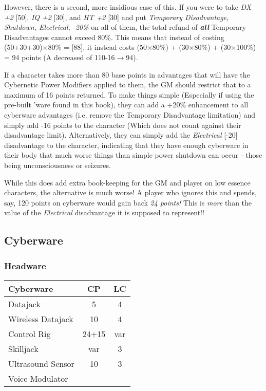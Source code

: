\begin{multicols*}{3}
	However, there is a second, more insidious case of this. If you were to take \textit{DX +2} [50], \textit{IQ +2} [30], and \textit{HT +2} [30] and put \textit{Temporary Disadvantage, Shutdown, Electrical, -20\%} on all of them, the total refund of \textbf{\textit{all}} Temporary Disadvantages cannot exceed 80\%. This means that instead of costing (50+30+30)$\times$80\% = [88], it instead costs (50$\times$80\%) + (30$\times$80\%) + (30$\times$100\%) = 94 points (A decreased of 110-16$\rightarrow$94).
	
	If a character takes more than 80 base points in advantages that will have the Cybernetic Power Modifiers applied to them, the GM should restrict that to a maximum of 16 points returned. To make things simple (Especially if using the pre-built 'ware found in this book), they can add a +20\% enhancement to all cyberware advantages (i.e. remove the Temporary Disadvantage limitation) and simply add -16 points to the character (Which does not count against their disadvantage limit). Alternatively, they can simply add the \textit{Electrical} [-20] disadvantage to the character, indicating that they have enough cyberware in their body that much worse things than simple power shutdown can occur - those being unconsciousness or seizures.
	
	While this does add extra book-keeping for the GM and player on low essence characters, the alternative is much worse! A player who ignores this and spends, say, 120 points on cyberware would gain back \textit{24 points!} This is \textit{more} than the value of the \textit{Electrical} disadvantage it is supposed to represent!!
	
	\subsection{Cyberware}
	
	\subsubsection{Headware}
	
	\begin{center}
		\begin{tabularx}{0.32\textwidth}{|X|c|c|}
			\hline
			Cyberware & CP & LC\\
			\hline
			\hline
			Datajack & 5 & 4\\
			Wireless Datajack & 10 & 4\\
			Control Rig & 24+15 & var\\
			Skilljack & var & 3 \\
			Ultrasound Sensor & 10 & 3 \\
			Voice Modulator & & \\
			\hline
		\end{tabularx}
	\end{center}
	

\end{multicols*}
